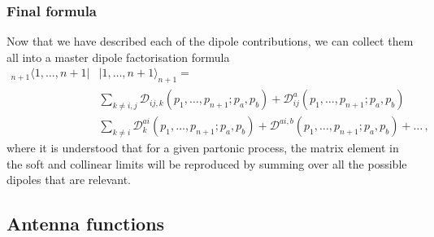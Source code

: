 \documentclass[main.tex]{subfiles}
\begin{document}
        \subsubsection{Final formula}
        Now that we have described each of the dipole contributions,
        we can collect them all into a master dipole factorisation
        formula
        \begin{equation}\label{eqn:dipole_factorisation_master}
            \begin{split}
            {}_{n+1} \langle 1, \ldots, n+1 | &| 1, \ldots, n+1 \rangle_{n+1} = \\
            &\sum_{k \neq i, j} \mathcal{D}_{ij,k}(p_{1},\ldots,p_{n+1};p_{a},p_{b}) + \mathcal{D}_{ij}^{a}(p_{1},\ldots,p_{n+1};p_{a},p_{b}) \\
            &\sum_{k \neq i} \mathcal{D}_{k}^{ai}(p_{1},\ldots,p_{n+1};p_{a},p_{b}) + \mathcal{D}^{ai,b}(p_{1},\ldots,p_{n+1};p_{a},p_{b}) + \ldots \, ,
            \end{split}
        \end{equation}
        where it is understood that for a given partonic process,
        the matrix element in the soft and collinear limits will be
        reproduced by summing over all the possible dipoles that are
        relevant.
\subsection{Antenna functions}\label{sec:antenna_functions}
\end{document}
